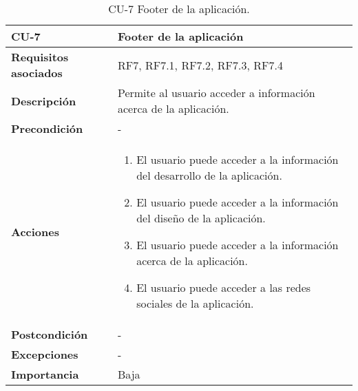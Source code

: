 \begin{table}[p]
	\centering
	\begin{tabularx}{\linewidth}{ p{} p{} }
		\toprule
		\textbf{CU-7}    & \textbf{Footer de la aplicación}\\
		\toprule
		\textbf{Requisitos asociados} & RF7, RF7.1, RF7.2, RF7.3, RF7.4 \\
		\textbf{Descripción}          & Permite al usuario acceder a información acerca de la aplicación. \\
		\textbf{Precondición}         & - \\
		\textbf{Acciones}             &
		\begin{enumerate}
			\def\labelenumi{\arabic{enumi}.}
			\tightlist
			\item El usuario puede acceder a la información del desarrollo de la aplicación.
            \item El usuario puede acceder a la información del diseño de la aplicación.
            \item El usuario puede acceder a la información acerca de la aplicación.
            \item El usuario puede acceder a las redes sociales de la aplicación.
		\end{enumerate}\\
		\textbf{Postcondición}        &  - \\
		\textbf{Excepciones}          &  - \\
		\textbf{Importancia}          & Baja \\
		\bottomrule
	\end{tabularx}
	\caption{CU-7 Footer de la aplicación.}
\end{table}

